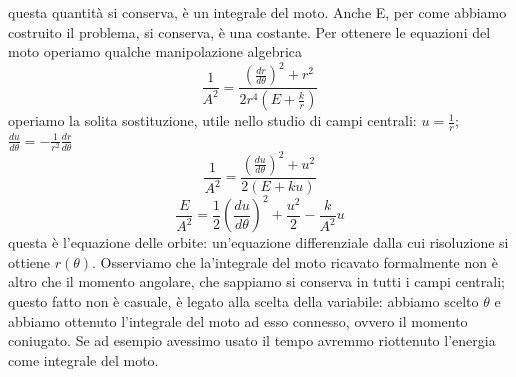 \documentclass[
10pt, %
a4paper, %
oneside, %
headinclude,footinclude, %
BCOR5mm, %
]{scrartcl}
\begin{document}
questa quantità si conserva, è un integrale del moto. Anche E, per come abbiamo costruito il problema, si conserva, è una costante. Per ottenere le equazioni del moto operiamo qualche manipolazione algebrica 
\[\frac{1}{A^2} = \frac{\left(\frac{dr}{d\theta}\right)^2+r^2}{2r^4\left(E+\frac{k}{r}\right)}\]
operiamo la solita sostituzione, utile nello studio di campi centrali: \(u = \frac{1}{r}\); \(\frac{du}{d\theta} = -\frac{1}{r^2}\frac{dr}{d\theta}\)
\[\frac{1}{A^2} = \frac{\left(\frac{du}{d\theta}\right)^2+u^2}{2(E+ku)}\]
\[\frac{E}{A^2} = \frac{1}{2}\left(\frac{du}{d\theta}\right)^2+\frac{u^2}{2}-\frac{k}{A^2}u\]
questa è l'equazione delle orbite: un'equazione differenziale dalla cui risoluzione si ottiene \(r(\theta)\). Osserviamo che la'integrale del moto ricavato formalmente non è altro che il momento angolare, che sappiamo si conserva in tutti i campi centrali; questo fatto non è casuale, è legato alla scelta della variabile: abbiamo scelto $\theta$ e abbiamo ottenuto l'integrale del moto ad esso connesso, ovvero il momento coniugato. Se ad esempio avessimo usato il tempo avremmo riottenuto l'energia come integrale del moto. 
\end{document}
